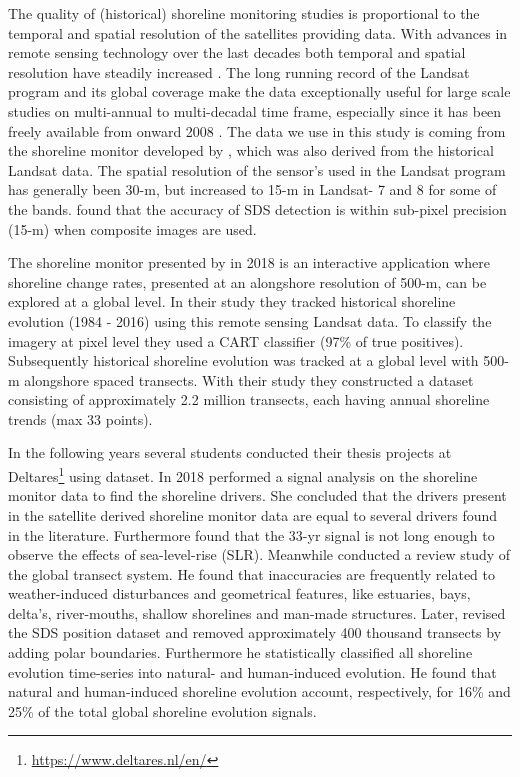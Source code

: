 \documentclass[format=sigconf, review=false, screen=true]{acmart}
\begin{document}
The quality of (historical) shoreline monitoring studies is proportional to the temporal and spatial resolution of the satellites providing data. With advances in remote sensing technology over the last decades both temporal and spatial resolution have steadily increased \citep{wulder2019current}. The long running record of the Landsat program and its global coverage make the data exceptionally useful for large scale studies on multi-annual to multi-decadal time frame, especially since it has been freely available from onward 2008 \cite{zhu2019benefits}. The data we use in this study is coming from the shoreline monitor developed by \citet{Luijendijk2018state}, which was also derived from the historical Landsat data. The spatial resolution of the sensor's used in the Landsat program has generally been 30-m, but increased to 15-m in Landsat- 7 and 8 for some of the bands. \citet{hagenaars2018accuracy} found that the accuracy of SDS detection is within sub-pixel precision (15-m) when composite images are used. 

The shoreline monitor presented by \citet{Luijendijk2018state} in 2018 is an interactive application where shoreline change rates, presented at an alongshore resolution of 500-m, can be explored at a global level. In their study they tracked historical shoreline evolution (1984 - 2016) using this remote sensing Landsat data. To classify the imagery at pixel level they used a CART classifier (97\% of true positives). Subsequently historical shoreline evolution was tracked at a global level with 500-m alongshore spaced transects. With their study they constructed a dataset consisting of approximately 2.2 million transects, each having annual shoreline trends (max 33 points).  

In the following years several students conducted their thesis projects at Deltares\footnote{\url{https://www.deltares.nl/en/}} using \citet{Luijendijk2018state} dataset. In 2018 \citet{Wang2018signal}  performed a signal analysis on the shoreline monitor data to find the shoreline drivers. She concluded that the drivers present in the satellite derived shoreline monitor data are equal to several drivers found in the literature. Furthermore \citet{Wang2018signal} found that the 33-yr signal is not long enough to observe the effects of sea-level-rise (SLR). Meanwhile \citet{Leeuwen2018shoreline} conducted a review study of the global transect system. He found that inaccuracies are frequently related to weather-induced disturbances and geometrical features, like estuaries, bays, delta's, river-mouths, shallow shorelines and man-made structures.  Later, \citet{Kras2019shoreline} revised the SDS position dataset and removed approximately 400 thousand transects by adding polar boundaries. Furthermore he statistically classified all shoreline evolution time-series into natural- and human-induced evolution. He found that natural and human-induced shoreline evolution account, respectively, for 16\% and 25\% of the total global shoreline evolution signals. 
    
\end{document}
